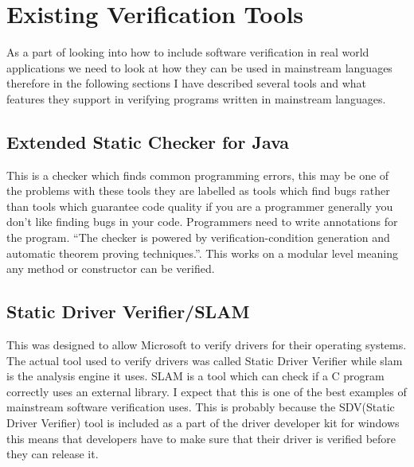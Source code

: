 \documentclass[a4paper,12pt]{scrartcl}
\begin{document}
	\section{Existing Verification Tools}
	{
		As a part of looking into how to include software verification in real world applications we need to look at how they can be used in mainstream languages therefore in the following sections I have described several tools and what features they support in verifying programs written in mainstream languages.
		\subsection{Extended Static Checker for Java\cite{Flanagan2002}}
		{
			This is a checker which finds common programming errors, this may be one of the problems with these tools they are labelled as tools which find bugs rather than tools which guarantee code quality if you are a programmer generally you don't like finding bugs in your code. Programmers need to write annotations for the program. \enquote{The checker is powered by verification-condition generation and automatic theorem proving techniques.}\cite{Flanagan2002}. This works on a modular level meaning any method or constructor can be verified.
		}
		\subsection{Static Driver Verifier/SLAM\cite{Ball2004}}
		{
			This was designed to allow Microsoft to verify drivers for their operating systems. The actual tool used to verify drivers was called Static Driver Verifier while slam is the analysis engine it uses. SLAM is a tool which can check if a C program correctly uses an external library. I expect that this is one of the best examples of mainstream software verification uses. This is probably because the SDV(Static Driver Verifier) tool is included as a part of the driver developer kit for windows this means that developers have to make sure that their driver is verified before they can release it.
		}
}
\end{document}
